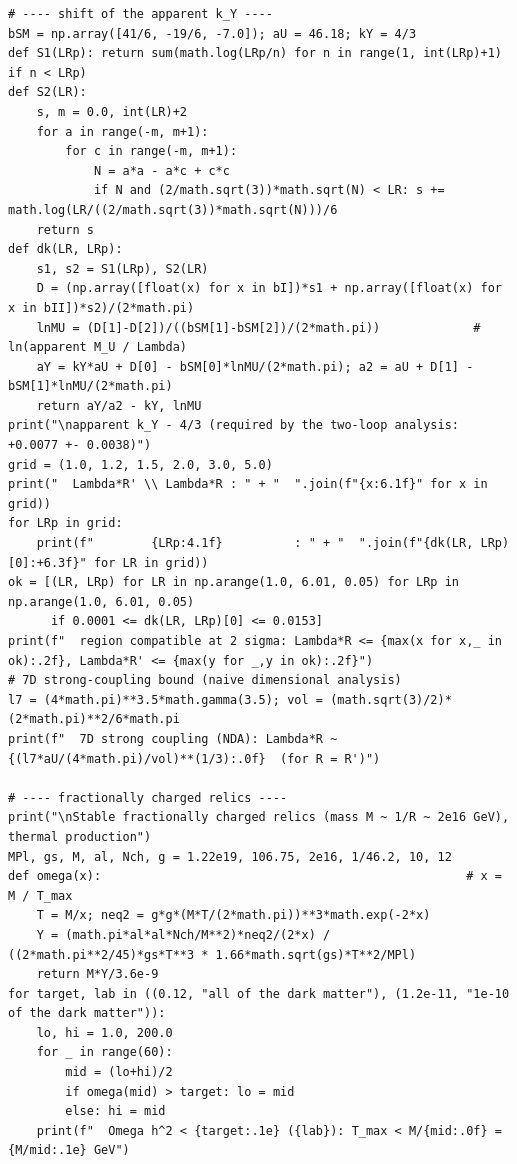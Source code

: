 \documentclass[11pt,a4paper]{article}
\begin{document}
\begin{lstlisting}
# ---- shift of the apparent k_Y ----
bSM = np.array([41/6, -19/6, -7.0]); aU = 46.18; kY = 4/3
def S1(LRp): return sum(math.log(LRp/n) for n in range(1, int(LRp)+1) if n < LRp)
def S2(LR):
    s, m = 0.0, int(LR)+2
    for a in range(-m, m+1):
        for c in range(-m, m+1):
            N = a*a - a*c + c*c
            if N and (2/math.sqrt(3))*math.sqrt(N) < LR: s += math.log(LR/((2/math.sqrt(3))*math.sqrt(N)))/6
    return s
def dk(LR, LRp):
    s1, s2 = S1(LRp), S2(LR)
    D = (np.array([float(x) for x in bI])*s1 + np.array([float(x) for x in bII])*s2)/(2*math.pi)
    lnMU = (D[1]-D[2])/((bSM[1]-bSM[2])/(2*math.pi))             # ln(apparent M_U / Lambda)
    aY = kY*aU + D[0] - bSM[0]*lnMU/(2*math.pi); a2 = aU + D[1] - bSM[1]*lnMU/(2*math.pi)
    return aY/a2 - kY, lnMU
print("\napparent k_Y - 4/3 (required by the two-loop analysis: +0.0077 +- 0.0038)")
grid = (1.0, 1.2, 1.5, 2.0, 3.0, 5.0)
print("  Lambda*R' \\ Lambda*R : " + "  ".join(f"{x:6.1f}" for x in grid))
for LRp in grid:
    print(f"        {LRp:4.1f}          : " + "  ".join(f"{dk(LR, LRp)[0]:+6.3f}" for LR in grid))
ok = [(LR, LRp) for LR in np.arange(1.0, 6.01, 0.05) for LRp in np.arange(1.0, 6.01, 0.05)
      if 0.0001 <= dk(LR, LRp)[0] <= 0.0153]
print(f"  region compatible at 2 sigma: Lambda*R <= {max(x for x,_ in ok):.2f}, Lambda*R' <= {max(y for _,y in ok):.2f}")
# 7D strong-coupling bound (naive dimensional analysis)
l7 = (4*math.pi)**3.5*math.gamma(3.5); vol = (math.sqrt(3)/2)*(2*math.pi)**2/6*math.pi
print(f"  7D strong coupling (NDA): Lambda*R ~ {(l7*aU/(4*math.pi)/vol)**(1/3):.0f}  (for R = R')")

# ---- fractionally charged relics ----
print("\nStable fractionally charged relics (mass M ~ 1/R ~ 2e16 GeV), thermal production")
MPl, gs, M, al, Nch, g = 1.22e19, 106.75, 2e16, 1/46.2, 10, 12
def omega(x):                                                   # x = M / T_max
    T = M/x; neq2 = g*g*(M*T/(2*math.pi))**3*math.exp(-2*x)
    Y = (math.pi*al*al*Nch/M**2)*neq2/(2*x) / ((2*math.pi**2/45)*gs*T**3 * 1.66*math.sqrt(gs)*T**2/MPl)
    return M*Y/3.6e-9
for target, lab in ((0.12, "all of the dark matter"), (1.2e-11, "1e-10 of the dark matter")):
    lo, hi = 1.0, 200.0
    for _ in range(60):
        mid = (lo+hi)/2
        if omega(mid) > target: lo = mid
        else: hi = mid
    print(f"  Omega h^2 < {target:.1e} ({lab}): T_max < M/{mid:.0f} = {M/mid:.1e} GeV")
\end{lstlisting}
\end{document}
